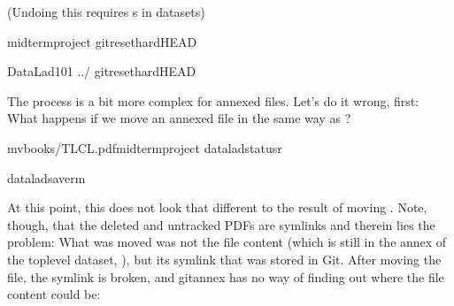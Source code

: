 \sphinxAtStartPar
(Undo\sphinxhyphen{}ing this requires s in  datasets)

\begin{sphinxVerbatim}[commandchars=\\\{\}]
midterm\PYGZus{}project
gitreset\PYGZhy{}\PYGZhy{}hardHEAD\PYGZti{}

DataLad\PYGZhy{}101
../
gitreset\PYGZhy{}\PYGZhy{}hardHEAD\PYGZti{}
\end{sphinxVerbatim}

\sphinxAtStartPar
The process is a bit more complex for annexed files. Let’s do it wrong, first:
What happens if we move an annexed file in the same way as ?

\begin{sphinxVerbatim}[commandchars=\\\{\}]
mvbooks/TLCL.pdfmidterm\PYGZus{}project
dataladstatus\PYGZhy{}r
\end{sphinxVerbatim}

\begin{sphinxVerbatim}[commandchars=\\\{\}]
dataladsave\PYGZhy{}r\PYGZhy{}m
\end{sphinxVerbatim}

\sphinxAtStartPar
At this point, this does not look that different to the result of moving
. Note, though, that the deleted and untracked PDFs are symlinks \textendash{}
and therein lies the problem: What was moved was not the file content (which is
still in the annex of the top\sphinxhyphen{}level dataset, ), but its symlink that
was stored in Git. After moving the file, the symlink is broken, and git\sphinxhyphen{}annex
has no way of finding out where the file content could be:

